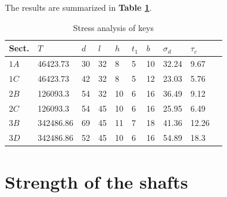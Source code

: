 The results are summarized in \textbf{Table \ref{keystress}}.
\begin{table}[ht]
	\centering
	\caption{Stress analysis of keys}
	\begin{tabular}{llllllllll}\toprule
		Sect. & $ T $ & $ d $ & $ l $ & $ h $ & $ t_1 $ & $ b $ & $ \sigma_d $ & $ \tau_c $\\\midrule
		$ 1A $ & 46423.73 & 30 & 32 & 8  & 5 & 10 & 32.24 & 9.67 \\
		$ 1C $ & 46423.73 & 42 & 32 & 8  & 5 & 12 & 23.03 & 5.76 \\
		$ 2B $ & 126093.3 & 54 & 32 & 10 & 6 & 16 & 36.49 & 9.12 \\
		$ 2C $ & 126093.3 & 54 & 45 & 10 & 6 & 16 & 25.95 & 6.49 \\
		$ 3B $ & 342486.86& 69 & 45 & 11 & 7 & 18 & 41.36 & 12.26 \\
		$ 3D $ & 342486.86& 52 & 45 & 10 & 6 & 16 & 54.89 & 18.3 \\\bottomrule
	\end{tabular}
	\label{keystress}
\end{table}

\section{Strength of the shafts}
